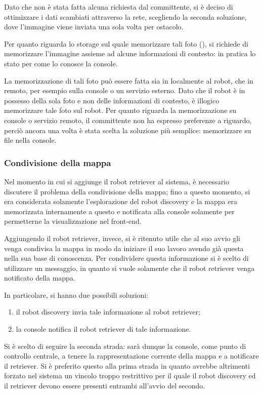 Dato che non è stata fatta alcuna richiesta dal committente, si è deciso di ottimizzare i dati scambiati attraverso la rete, scegliendo la seconda soluzione, dove l'immagine viene inviata una sola volta per ostacolo.

Per quanto riguarda lo storage sul quale memorizzare tali foto (), si richiede di memorizzare l'immagine assieme ad alcune informazioni di contesto:
in pratica lo stato per come lo conosce la console.

La memorizzazione di tali foto può essere fatta sia in localmente al robot, che in remoto, per esempio sulla console o un servizio esterno.
Dato che il robot è in possesso della sola foto e non delle informazioni di contesto, è illogico memorizzare tale foto sul robot.
Per quanto riguarda la memorizzazione su console o servizio remoto, il committente non ha espresso preferenze a riguardo, perciò ancora una volta è stata scelta la soluzione più semplice:
memorizzare su file nella console.

\subsubsection{Condivisione della mappa}

Nel momento in cui si aggiunge il robot retriever al sistema, è necessario discutere il problema della condivisione della mappa;
fino a questo momento, si era considerata solamente l'esplorazione del robot discovery e la mappa era memorizzata internamente a questo e notificata alla console solamente per permetterne la visualizzazione nel front-end.

Aggiungendo il robot retriever, invece, si è ritenuto utile che al suo avvio gli venga condivisa la mappa in modo da iniziare il suo lavoro avendo già questa nella sua base di conoscenza.
Per condividere questa informazione si è scelto di utilizzare un messaggio, in quanto si vuole solamente che il robot retriever venga notificato della mappa.

In particolare, si hanno due possibili soluzioni:

\begin{enumerate}
  \item il robot discovery invia tale informazione al robot retriever;
  \item la console notifica il robot retriever di tale informazione.
\end{enumerate}

Si è scelto di seguire la seconda strada: sarà dunque la console, come punto di controllo centrale, a tenere la rappresentazione corrente della mappa e a notificare il retriever.
Si è preferito questo alla prima strada in quanto avrebbe altrimenti forzato nel sistema un vincolo troppo restrittivo per il quale il robot discovery ed il retriever devono essere presenti entrambi all'avvio del secondo.

